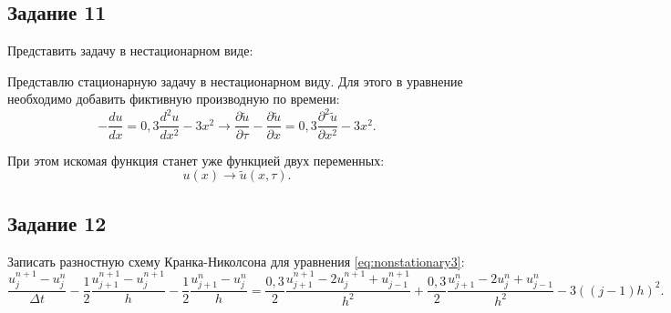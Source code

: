 \documentclass[12pt, a4paper]{report}
\begin{document}
	\subsection*{Задание 11}
	\large
	Представить задачу в нестационарном виде: \par
	Представлю стационарную задачу в нестационарном виду. Для этого в уравнение необходимо добавить фиктивную производную по времени:
	\begin{equation}\label{eq:nonstationary3}
		-\frac{du}{dx}=0,3\frac{d^{2}u}{dx^{2}}-3x^{2} \rightarrow \frac{\partial \tilde{u}}{\partial \tau}-\frac{\partial \tilde{u}}{\partial x}=0,3\frac{\partial^{2} \tilde{u}}{\partial x^{2}}-3x^{2}.
	\end{equation}
	\par
	При этом искомая функция станет уже функцией двух переменных:
	\begin{equation*}
		u(x) \rightarrow \tilde{u}(x,\tau).
	\end{equation*}

	\subsection*{Задание 12}
	\large
	Записать разностную схему Кранка-Николсона для уравнения \eqref{eq:nonstationary3}:
	\small
	\begin{equation}\label{eq:crankNicholson3}
		\frac{u_{j}^{n+1} - u_{j}^{n}}{\Delta t} - \frac{1}{2}\frac{u_{j+1}^{n+1} - u_{j}^{n+1}}{h} - \frac{1}{2}\frac{u_{j+1}^{n} - u_{j}^{n}}{h} = \frac{0,3}{2}\frac{u_{j+1}^{n+1} - 2u_{j}^{n+1} + u_{j-1}^{n+1}}{h^{2}} + \frac{0,3}{2}\frac{u_{j+1}^{n} - 2u_{j}^{n} + u_{j-1}^{n}}{h^{2}} - 3((j-1)h)^{2}.
	\end{equation}
\end{document}
